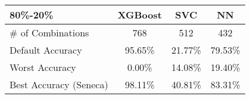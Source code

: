 
\begin{tabular}{|l|c|c|c|}
\hline
\textbf{80\%-20\%} & XGBoost & SVC & NN\\
\hline
\# of Combinations & 768 & 512 & 432 \\
\hline
\hline
Default Accuracy & 95.65\% & 21.77\% & 79.53\%\\
\hline
Worst Accuracy&0.00\%&14.08\% & 19.40\%\\
\hline
Best Accuracy (Seneca) &98.11\% & 40.81\% & 83.31\%\\
\hline

\end{tabular}

